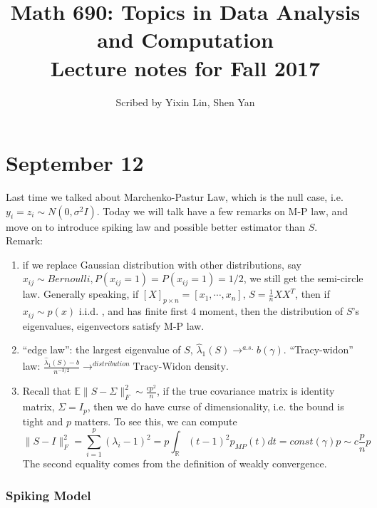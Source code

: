 \documentclass[12pt]{article}
\title{Math 690: Topics in Data Analysis and Computation\\ \large Lecture notes for Fall 2017}
\date{}
\author{\small Scribed by Yixin Lin, Shen Yan}
\theoremstyle{plain}
\begin{document}
\maketitle
\part*{September 12}
Last time we talked about Marchenko-Pastur Law, which is the null case, i.e. $y_i=z_i \sim N(0,\sigma^2 I)$. Today we will talk have a few remarks on M-P law, and move on to introduce spiking law and possible better estimator than $S$. \\
Remark:
\begin{enumerate}
\item if we replace Gaussian distribution with other distributions, say $x_{ij} \sim Bernoulli, P(x_{ij} = 1) = P(x_{ij} = 1) = 1/2$, we still get the semi-circle law. Generally speaking, if $[X]_{p \times n} = [x_1, \cdots, x_n] $, $S = \frac{1}{n}XX^T$, then if $x_{ij} \sim p(x)$ i.i.d. , and has finite first 4 moment, then the distribution of $S$'s eigenvalues, eigenvectors satisfy M-P law.
\item ``edge law'': the largest eigenvalue of $S$, $\hat{\lambda}_1(S) \rightarrow^{a.s.} b(\gamma)$. ``Tracy-widon'' law: $\frac{\hat{\lambda}_1(S) -b}{n^{-3/2}} \rightarrow^{distribution} \text{Tracy-Widon density}$. 
\item Recall that $\mathbb{E}\|S-\Sigma\|^2_F \sim \frac{cp^2}{n}$, if the true covariance matrix is identity matrix, $\Sigma = I_p$, then we do have curse of dimensionality, i.e. the bound is tight and $p$ matters. To see this, we can compute
$$\|S-I\|^2_F = \sum_{i=1}^p (\lambda_i - 1)^2 = p \int_{\mathbb{R}} (t-1)^2 p_{MP}(t)dt = const(\gamma) p \sim c\frac{p}{n}p$$
The second equality comes from the definition of weakly convergence.
\end{enumerate}


\section*{Spiking Model}
\end{document}
